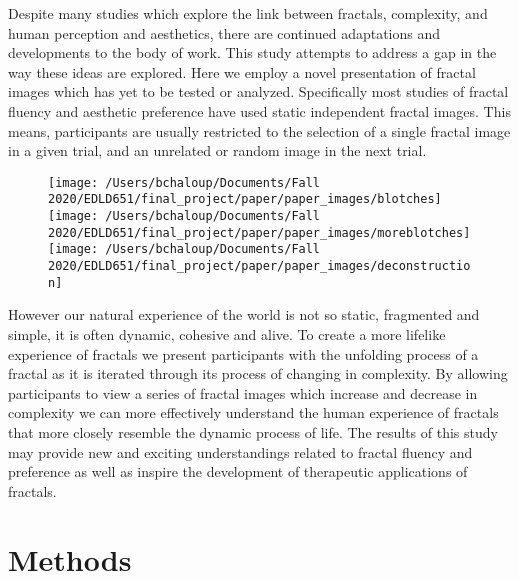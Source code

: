 \documentclass[english,jou]{apa6}
\begin{document}
Despite many studies which explore the link between fractals, complexity, and human perception and aesthetics, there are continued adaptations and developments to the body of work. This study attempts to address a gap in the way these ideas are explored. Here we employ a novel presentation of fractal images which has yet to be tested or analyzed. Specifically most studies of fractal fluency and aesthetic preference have used static independent fractal images. This means, participants are usually restricted to the selection of a single fractal image in a given trial, and an unrelated or random image in the next trial.

\begin{figure}

\texttt{[image: /Users/bchaloup/Documents/Fall 2020/EDLD651/final\_project/paper/paper\_images/blotches]} \texttt{[image: /Users/bchaloup/Documents/Fall 2020/EDLD651/final\_project/paper/paper\_images/moreblotches]} \texttt{[image: /Users/bchaloup/Documents/Fall 2020/EDLD651/final\_project/paper/paper\_images/deconstruction]} \hfill{}

\caption{ }\label{fig:unnamed-chunk-5}
\end{figure}

However our natural experience of the world is not so static, fragmented and simple, it is often dynamic, cohesive and alive. To create a more lifelike experience of fractals we present participants with the unfolding process of a fractal as it is iterated through its process of changing in complexity. By allowing participants to view a series of fractal images which increase and decrease in complexity we can more effectively understand the human experience of fractals that more closely resemble the dynamic process of life. The results of this study may provide new and exciting understandings related to fractal fluency and preference as well as inspire the development of therapeutic applications of fractals.

\hypertarget{methods}{%
\section{Methods}\label{methods}}
\end{document}
